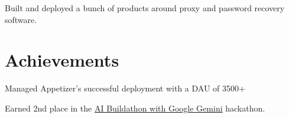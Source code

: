 \documentclass[letterpaper]{deedy-resume} %
\begin{document}
\begin{minipage}[t]{0.66\textwidth}
Built and deployed a bunch of products around proxy and password recovery software.
\sectionspace %





\section{Achievements} 
\begin{tightitemize}
\sectionspace %
\item Managed Appetizer's successful deployment with a DAU of 3500+
\item Earned 2nd place in the \href{https://www.linkedin.com/feed/update/urn:li:activity:7202265494651822080/}{AI Buildathon with Google Gemini} hackathon.


\end{tightitemize}



\end{minipage} %
\end{document}
